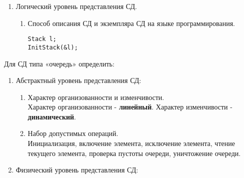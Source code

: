 \documentclass[a4paper,14pt]{extarticle}
\begin{document}
\begin{enumerate}
\begin{enumerate}[label*=\arabic*.]
              \item Логический уровень представления СД.
                    \begin{enumerate}[label*=\arabic*.]
                        \item Способ описания СД и экземпляра СД на языке программирования.\\
                              \begin{verbatim}
Stack l;
InitStack(&l);
												  \end{verbatim}
                    \end{enumerate}
          \end{enumerate}
          Для СД типа «очередь» определить:
          \begin{enumerate}[label*=\arabic*.]
              \item Абстрактный уровень представления СД:

                    \begin{enumerate}[label*=\arabic*.]
                        \item Характер организованности и изменчивости.\\
                              Характер организованности - \textbf{линейный}. Характер изменчивости - \textbf{динамический}.
                        \item Набор допустимых операций.\\
                              Инициализация,
                              включение элемента,
                              исключение элемента,
                              чтение текущего элемента,
                              проверка пустоты очереди,
                              уничтожение очереди.
                    \end{enumerate}

              \item Физический уровень представления СД:


\end{enumerate}
\end{enumerate}
\end{document}
